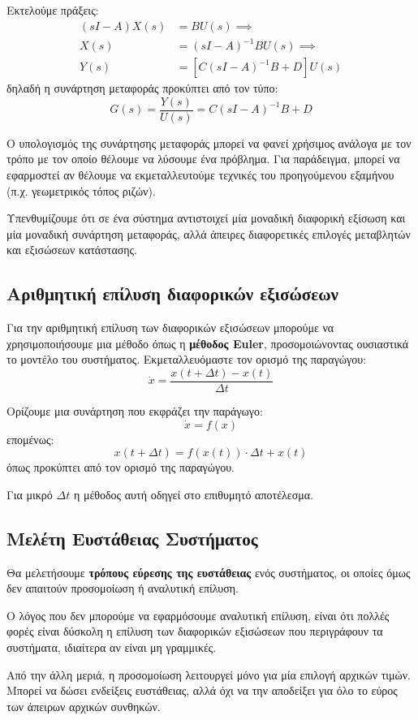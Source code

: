 \documentclass[11pt,a4paper,notitlepage,fleqn]{article}
\begin{document}
Εκτελούμε πράξεις:
\begin{align*}
	(sI-A)X(s) &= BU(s) \implies \\
	X(s) &= (sI-A)^{-1} B U(s) \implies \\
	Y(s) &= \left[ C(sI-A)^{-1}B+D \right]U(s)
\end{align*}
δηλαδή η συνάρτηση μεταφοράς προκύπτει από τον τύπο:
\[
\boxed{
	G(s) = \frac{Y(s)}{U(s)} = C(sI-A)^{-1}B+D
	}
\]

Ο υπολογισμός της συνάρτησης μεταφοράς μπορεί να φανεί χρήσιμος ανάλογα με τον τρόπο με
τον οποίο θέλουμε να λύσουμε ένα πρόβλημα. Για παράδειγμα, μπορεί να εφαρμοστεί αν θέλουμε
να εκμεταλλευτούμε τεχνικές του προηγούμενου εξαμήνου (π.χ. γεωμετρικός τόπος ριζών).

Υπενθυμίζουμε ότι σε ένα σύστημα αντιστοιχεί μία μοναδική διαφορική εξίσωση και μία μοναδική
συνάρτηση μεταφοράς, αλλά άπειρες διαφορετικές επιλογές μεταβλητών και εξισώσεων κατάστασης.

\subsection{Αριθμητική επίλυση διαφορικών εξισώσεων}
Για την αριθμητική επίλυση των διαφορικών εξισώσεων μπορούμε να χρησιμοποιήσουμε μια μέθοδο
όπως η \textbf{μέθοδος Euler}, προσομοιώνοντας ουσιαστικά το μοντέλο του συστήματος.
Εκμεταλλευόμαστε τον ορισμό της παραγώγου:
\[
\dot x = \frac{x(t+\Delta t) - x(t)}{\Delta t}
\]

Ορίζουμε μια συνάρτηση που εκφράζει την παράγωγο:
\[
\dot x = f(x)
\]
επομένως:
\[
x(t+\Delta t) = f\left( x(t) \right) \cdot \Delta t + x(t)
\]
όπως προκύπτει από τον ορισμό της παραγώγου.

Για μικρό \( \Delta t \) η μέθοδος αυτή οδηγεί στο επιθυμητό αποτέλεσμα.

\subsection{Μελέτη Ευστάθειας Συστήματος}
Θα μελετήσουμε \textbf{τρόπους εύρεσης της ευστάθειας} ενός συστήματος, οι οποίες όμως δεν απαιτούν
προσομοίωση ή αναλυτική επίλυση.

Ο λόγος που δεν μπορούμε να εφαρμόσουμε αναλυτική επίλυση, είναι ότι πολλές φορές είναι
δύσκολη η επίλυση των διαφορικών εξισώσεων που περιγράφουν τα συστήματα, ιδιαίτερα αν είναι
μη γραμμικές.

Από την άλλη μεριά, η προσομοίωση λειτουργεί μόνο για μία επιλογή αρχικών τιμών. Μπορεί να
δώσει ενδείξεις ευστάθειας, αλλά όχι να την αποδείξει για όλο το εύρος των άπειρων αρχικών
συνθηκών.
\end{document}

